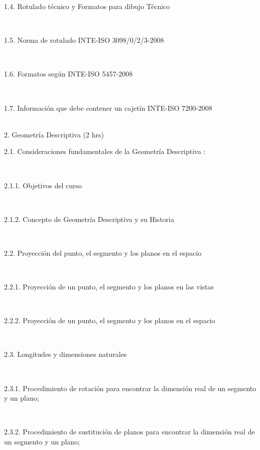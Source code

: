 \documentclass[letterpaper]{article}%
\begin{document}
\hspace*{0.02\linewidth}\parbox{0.98\linewidth}{\strut 1.4. Rotulado técnico y Formatos para dibujo Técnico\strut}\\
\hspace*{0.02\linewidth}\parbox{0.98\linewidth}{\strut 1.5. Norma de rotulado INTE-ISO 3098/0/2/3-2008\strut}\\
\hspace*{0.02\linewidth}\parbox{0.98\linewidth}{\strut 1.6. Formatos según INTE-ISO 5457-2008\strut}\\
\hspace*{0.02\linewidth}\parbox{0.98\linewidth}{\strut 1.7. Información que debe contener un cajetín INTE-ISO 7200-2008\strut}\\
2. Geometría Descriptiva (2 hrs)\\
\hspace*{0.02\linewidth}\parbox{0.98\linewidth}{\strut 2.1. Consideraciones fundamentales de la Geometría Descriptiva :\strut}\\
\hspace*{0.04\linewidth}\parbox{0.96\linewidth}{\strut 2.1.1. Objetivos del curso\strut}\\
\hspace*{0.04\linewidth}\parbox{0.96\linewidth}{\strut 2.1.2. Concepto de Geometría Descriptiva y su Historia\strut}\\
\hspace*{0.02\linewidth}\parbox{0.98\linewidth}{\strut 2.2. Proyección del punto, el segmento y los planos en el espacio\strut}\\
\hspace*{0.04\linewidth}\parbox{0.96\linewidth}{\strut 2.2.1. Proyección de un punto, el segmento y los planos en las vistas\strut}\\
\hspace*{0.04\linewidth}\parbox{0.96\linewidth}{\strut 2.2.2. Proyección de un punto, el segmento y los planos en el espacio\strut}\\
\hspace*{0.02\linewidth}\parbox{0.98\linewidth}{\strut 2.3. Longitudes y dimensiones naturales\strut}\\
\hspace*{0.04\linewidth}\parbox{0.96\linewidth}{\strut 2.3.1. Procedimiento de rotación para encontrar la dimensión real de un segmento y un plano;\strut}\\
\hspace*{0.04\linewidth}\parbox{0.96\linewidth}{\strut 2.3.2. Procedimiento de sustitución de planos para encontrar la dimensión real de un segmento y un plano;\strut}\\
\end{document}
